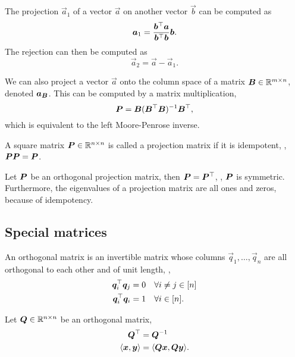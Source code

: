 \documentclass[justified,nobib]{tufte-handout}
\newcommand{\ang}[1]{\langle #1 \rangle}
\begin{document}
The projection $\vec{a}_1$ of a vector $\vec{a}$ on another vector $\vec{b}$ can be computed as \[
    \bm{a}_1 = \frac{\bm{b}^\top\bm{a}}{\bm{b}^\top\bm{b}} \bm{b}.
\]
The rejection can then be computed as \[
    \vec{a}_2 = \vec{a} - \vec{a}_1.
\]

We can also project a vector $\vec{a}$ onto the column space of a matrix $\bm{B} \in \mathbb{R}^{m\times
        n}$, denoted $\bm{a}_{\bm{B}}$. This can be computed by a matrix multiplication, \[
    \bm{P} = \bm{B}(\bm{B}^\top\bm{B})^{-1} \bm{B}^\top,
\]
which is equivalent to the left Moore-Penrose inverse.

\begin{definition}
    A square matrix $\bm{P} \in \mathbb{R}^{n\times n}$ is called a projection matrix if it is idempotent, \ie,
    $\bm{P}\bm{P} = \bm{P}$.
\end{definition}

\begin{properties}
    Let $\bm{P}$ be an orthogonal projection matrix, then $\bm{P} = \bm{P}^\top$, \ie, $\bm{P}$
    is symmetric. Furthermore, the eigenvalues of a projection matrix are all ones and zeros, because of idempotency.
\end{properties}

\subsection{Special matrices}

\begin{definition}
    An orthogonal matrix is an invertible matrix whose columns $\vec{q}_1,\ldots,\vec{q}_n$ are all
    orthogonal to each other and of unit length, \ie,
    \begin{align*}
        \bm{q}_i^\top \bm{q}_j & = 0 \quad \forall i \neq j \in [n] \\
        \bm{q}_i^\top \bm{q}_i & = 1 \quad \forall i \in [n].
    \end{align*}
\end{definition}

\begin{properties}
    Let $\bm{Q}\in \mathbb{R}^{n\times n}$ be an orthogonal matrix,
    \begin{align*}
        \transpose{\mat{Q}}   & = \inv{\mat{Q}}                         \\
        \ang{\vec{x},\vec{y}} & = \ang{\mat{Q}\vec{x}, \mat{Q}\vec{y}}.
    \end{align*}
\end{properties}

\newpage


\end{document}
